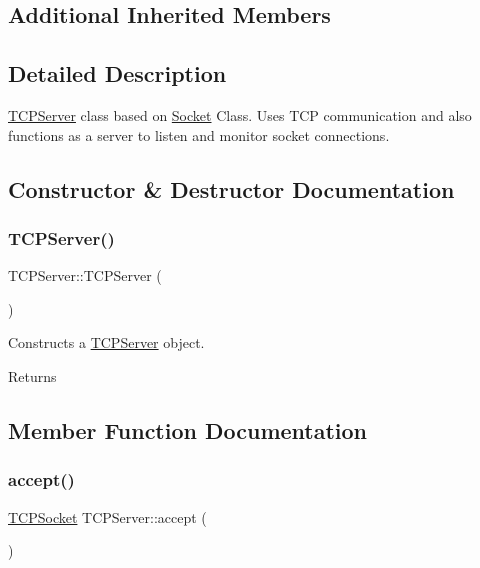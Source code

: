 \subsection*{Additional Inherited Members}


\subsection{Detailed Description}
\hyperlink{classTCPServer}{T\+C\+P\+Server} class based on \hyperlink{classSocket}{Socket} Class. Uses T\+CP communication and also functions as a server to listen and monitor socket connections. 

\subsection{Constructor \& Destructor Documentation}
\mbox{\label{classTCPServer_a3a5e3cfe42c676ed71f2bc58dcc92bda}} 
\subsubsection{\texorpdfstring{T\+C\+P\+Server()}{TCPServer()}}
{\footnotesize\ttfamily T\+C\+P\+Server\+::\+T\+C\+P\+Server (\begin{DoxyParamCaption}{ }\end{DoxyParamCaption})}



Constructs a \hyperlink{classTCPServer}{T\+C\+P\+Server} object. 

\begin{DoxyReturn}{Returns}

\end{DoxyReturn}


\subsection{Member Function Documentation}
\mbox{\label{classTCPServer_a1a60f00dce65a4c2b855b37ea9308f6e}} 
\subsubsection{\texorpdfstring{accept()}{accept()}}
{\footnotesize\ttfamily \hyperlink{classTCPSocket}{T\+C\+P\+Socket} T\+C\+P\+Server\+::accept (\begin{DoxyParamCaption}{ }\end{DoxyParamCaption})}



